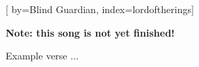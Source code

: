 
[%
    by={Blind Guardian},
    index={lordoftherings}]


    \label{lordoftherings}

    \textbf{Note: this song is not yet finished!}

    \beginverse
        Example verse ...
    \endverse
\endsong
